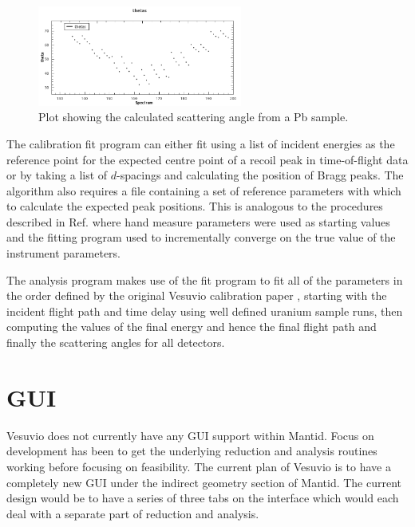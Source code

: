 \documentclass[paper=a4, fontsize=11pt]{scrartcl}	%
\numberwithin{equation}{section}															%
\numberwithin{figure}{section}																%
\numberwithin{table}{section}
\begin{document}
\begin{figure}[H]
\centering
\includegraphics[width=0.6\textwidth]{img/calib-theta.png}
\caption{Plot showing the calculated scattering angle from a Pb sample.}
\label{fig:calib-theta}
\end{figure}

The calibration fit program can either fit using a list of incident energies as the reference point for the expected centre point of a recoil peak in time-of-flight data or by taking a list of $d$-spacings and calculating the position of Bragg peaks. The algorithm also requires a file containing a set of reference parameters with which to calculate the expected peak positions. This is analogous to the procedures described in Ref. \cite{mayers2011calibration} where hand measure parameters were used as starting values and the fitting program used to incrementally converge on the true value of the instrument parameters.

The analysis program makes use of the fit program to fit all of the parameters in the order defined by the original Vesuvio calibration paper \cite{mayers2011calibration}, starting with the incident flight path and time delay using well defined uranium sample runs, then computing the values of the final energy and hence the final flight path and finally the scattering angles for all detectors.

\section{GUI}
\label{sec:GUI}
Vesuvio does not currently have any GUI support within Mantid. Focus on development has been to get the underlying reduction and analysis routines working before focusing on feasibility. The current plan of Vesuvio is to have a completely new GUI under the indirect geometry section of Mantid. The current design would be to have a series of three tabs on the interface which would each deal with a separate part of reduction and analysis.
\end{document}
